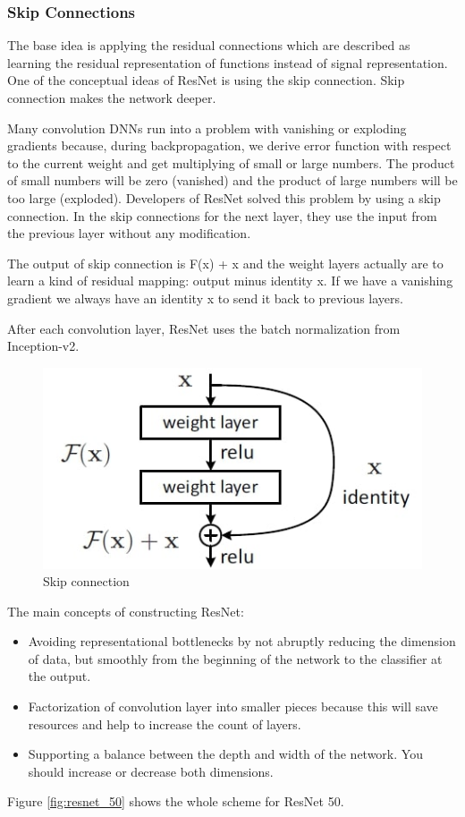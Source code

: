 \subsubsection{Skip Connections}
The base idea is applying the residual connections which are described as learning the residual representation of functions instead of signal representation. One of the conceptual ideas of ResNet is using the skip connection. Skip connection makes the network deeper.

Many convolution DNNs run into a problem with vanishing or exploding gradients because, during backpropagation, we derive error function with respect to the current weight and get multiplying of small or large numbers. The product of small numbers will be zero (vanished) and the product of large numbers will be too large (exploded). Developers of ResNet solved this problem by using a skip connection. In the skip connections for the next layer, they use the input from the previous layer without any modification. 

The output of skip connection is  F(x) + x and the weight layers actually are to learn a kind of residual mapping: output minus identity x. If we have a vanishing gradient we always have an identity x to send it back to previous layers. 

After each convolution layer, ResNet uses the batch normalization from Inception-v2. 

\begin{figure}[h!]
    \centering
    \includegraphics[scale=0.4]{resnet_1}
    \caption{Skip connection}
\end{figure}

The main concepts of constructing ResNet:
\begin{itemize}
\item Avoiding representational bottlenecks by not abruptly reducing the dimension of data, but smoothly from the beginning of the network to the classifier at the output.
\item Factorization of convolution layer into smaller pieces because this will save resources and help to increase the count of layers.
\item Supporting a balance between the depth and width of the network. You should increase or decrease both dimensions.
\end{itemize}

Figure \ref{fig:resnet_50} shows the whole scheme for ResNet 50.


